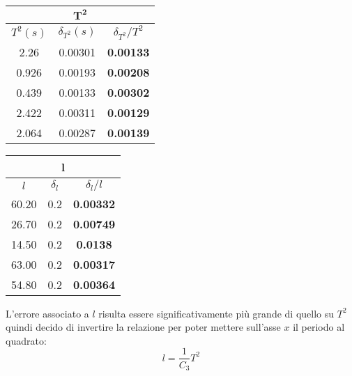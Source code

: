 \documentclass{article}
\begin{document}
	\begin{minipage}{0.5\textwidth}
		\begin{table}[H]
			\centering
			\begin{tabular}{@{}ccc@{}}
				\multicolumn{3}{c}{$\mathbf{T^2}$} \\ \midrule
				$T^2(s)$ & $\delta_{T^2} (s)$ & $\delta_{T^2} / T^2$ \\ \midrule
				2.26 & 0.00301 & \textbf{0.00133 }\\
				0.926 & 0.00193 & \textbf{0.00208} \\
				0.439 & 0.00133 & \textbf{0.00302} \\
				2.422 & 0.00311 & \textbf{0.00129} \\
				2.064 & 0.00287 & \textbf{0.00139}  \\ \bottomrule   
			\end{tabular}
		\end{table}
	\end{minipage}
	\begin{minipage}{0.5\textwidth}
		\begin{table}[H]
			\centering
			\begin{tabular}{@{}ccc@{}}
				\multicolumn{3}{c}{\textbf{l}} \\ \midrule
				$l$ & $\delta_l$ & $\delta_l / l$ \\ \midrule
				60.20 & 0.2 & \textbf{0.00332} \\
				26.70 & 0.2 & \textbf{0.00749} \\
				14.50 & 0.2 & \textbf{0.0138} \\
				63.00 & 0.2 & \textbf{0.00317} \\
				54.80 & 0.2 & \textbf{0.00364} \\ \bottomrule  
			\end{tabular}
		\end{table}
	\end{minipage}
	\vspace{1cm}
	
	\noindent
	L'errore associato a $l$ risulta essere significativamente più grande di quello su $T^2$ quindi decido di invertire la relazione per poter mettere sull'asse $x$ il periodo al quadrato:
	\[
	l = \frac{1}{C_3} T^2
	\]
	
\end{document}

